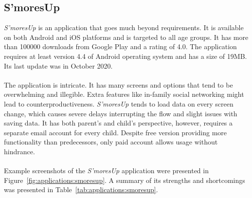 \subsection{S'moresUp}\label{subsec:market:solutions:smoresup}
\textit{S'moresUp} \cite{SmoresUpSmartChores,MoresUpBestChores} is an application that goes much beyond requirements. It is available on both Android and iOS platforms and is targeted to all age groups. It has more than 100000 downloads from Google Play and a rating of 4.0. The application requires at least version 4.4 of Android operating system and has a size of 19MB. Its last update was in October 2020.
\\\\
The application is intricate. It has many screens and options that tend to be overwhelming and illegible. Extra features like in-family social networking might lead to counterproductiveness. \textit{S'moresUp} tends to load data on every screen change, which causes severe delays interrupting the flow and slight issues with saving data. It has both parent's and child's perspective, however, requires a separate email account for every child. Despite free version providing more functionality than predecessors, only paid account allows usage without hindrance.
\\\\
Example screenshots of the \textit{S'moresUp} application were presented in Figure~\ref{fig:applications:smoresup}. A summary of its strengths and shortcomings was presented in Table~\ref{tab:applications:smoresup}.
\\




